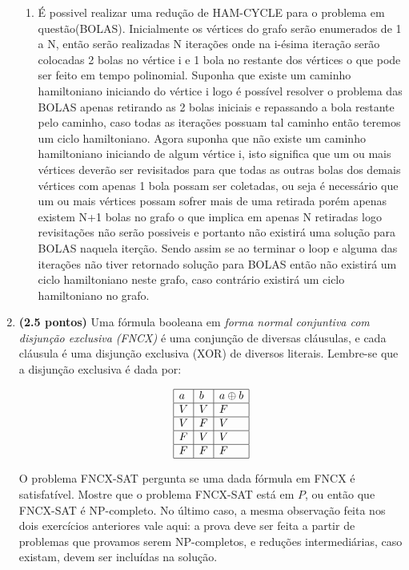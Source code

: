 \documentclass[12pt]{article}
\begin{document}
\begin{enumerate}
{\begin{enumerate}
    \item É possivel realizar uma redução de HAM-CYCLE para o problema em questão(BOLAS). Inicialmente os vértices do grafo serão enumerados de 1 a N, então serão realizadas N iterações onde na i-ésima iteração serão colocadas 2 bolas no vértice i e 1 bola no restante dos vértices o que pode ser feito em tempo polinomial. Suponha que existe um caminho hamiltoniano iniciando do vértice i logo é possível resolver o problema das BOLAS apenas retirando as 2 bolas iniciais e repassando a bola restante pelo caminho, caso todas as iterações possuam tal caminho então teremos um ciclo hamiltoniano. Agora suponha que não existe um caminho hamiltoniano iniciando de algum vértice i, isto significa que um ou mais vértices deverão ser revisitados para que todas as outras bolas dos demais vértices com apenas 1 bola possam ser coletadas, ou seja é necessário que um ou mais vértices possam sofrer mais de uma retirada porém apenas existem N+1 bolas no grafo o que implica em apenas N retiradas logo revisitações não serão possiveis e portanto não existirá uma solução para BOLAS naquela iterção. Sendo assim se ao terminar o loop e alguma das iterações não tiver retornado solução para BOLAS então não existirá um ciclo hamiltoniano neste grafo, caso contrário existirá um ciclo hamiltoniano no grafo.
    
    \end{enumerate}

}
  
\item {\bf (2.5 pontos)} Uma fórmula booleana em {\it forma normal conjuntiva com disjunção exclusiva (FNCX)} é uma conjunção de diversas cláusulas, e cada cláusula é uma disjunção exclusiva (XOR) de diversos literais. Lembre-se que a disjunção exclusiva é dada por:

  $$\begin{array}{|l|l|l|}\hline
      a & b & a \oplus b \\ \hline
      V & V & F \\ \hline
      V & F & V \\ \hline
      F & V & V \\ \hline
      F & F & F \\ \hline
  \end{array}$$

  O problema FNCX-SAT pergunta se uma dada fórmula em FNCX é
  satisfatível. Mostre que o problema FNCX-SAT está em $P$, ou então
  que FNCX-SAT é NP-completo. No último caso, a mesma observação feita
  nos dois exercícios anteriores vale aqui: a prova deve ser feita a
  partir de problemas que provamos serem NP-completos, e reduções
  intermediárias, caso existam, devem ser incluídas na solução.


\end{enumerate}
\end{document}
